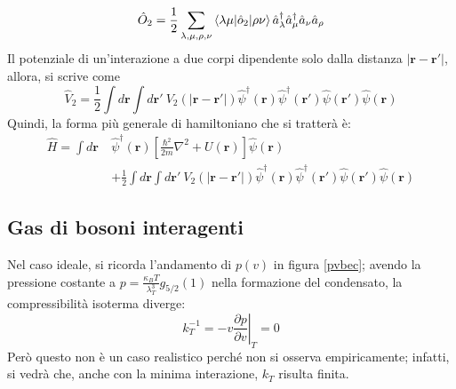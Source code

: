 \documentclass[11pt, a4paper]{scrartcl}
\theoremstyle{style}
\theoremstyle{style1}
\newcommand*\Eval[3]{\left.#1\right\rvert_{#2}^{#3}}
\numberwithin{equation}{subsection}
\begin{document}
\[
\hat{O}_2 = \frac{1}{2}\sum_{\lambda , \mu , \rho ,\nu }^{} \braket{\lambda \mu |\hat{o}_2|\rho \nu } \hat{a}^\dagger _\lambda \hat{a}^\dagger _\mu \hat{a}_\nu \hat{a}_\rho 
\] 
Il potenziale di un'interazione a due corpi dipendente solo dalla distanza $\lvert \mathbf{r} -\mathbf{r} ' \rvert $, allora, si scrive come
\begin{equation}
	\hat{V}_2 = \frac{1}{2} \int d\mathbf{r}  \int d\mathbf{r} ' \ V_2 \left(\lvert \mathbf{r} -\mathbf{r} ' \rvert \right) \hat{\psi }^\dagger (\mathbf{r} ) \hat{\psi }^\dagger (\mathbf{r} ') \hat{\psi }(\mathbf{r} ') \hat{\psi }(\mathbf{r} )
\end{equation}
Quindi, la forma pi\`u generale di hamiltoniano che si tratter\`a \`e:
\begin{equation}\label{h2}
	\begin{split}
		\hat{H} = \int d\mathbf{r} \  & \hat{\psi }^\dagger (\mathbf{r} ) \left[ \frac{\hbar ^2}{2m}\nabla ^2 + U (\mathbf{r} ) \right] \hat{\psi }(\mathbf{r} ) \\
					      &+ \frac{1}{2} \int d\mathbf{r}  \int d\mathbf{r} ' \ V_2 \left(\lvert \mathbf{r} -\mathbf{r} ' \rvert \right) \hat{\psi }^\dagger (\mathbf{r} ) \hat{\psi }^\dagger (\mathbf{r} ') \hat{\psi }(\mathbf{r} ') \hat{\psi }(\mathbf{r} )
	\end{split}
\end{equation}
\subsection{Gas di bosoni interagenti}
Nel caso ideale, si ricorda l'andamento di $p(v)$ in figura \ref{pvbec}; avendo la pressione costante a $p = \frac{\kappa _B T }{\lambda _T^3} g_{5 / 2} (1)$ nella formazione del condensato, la compressibilit\`a isoterma diverge:
\[
	k_T^{-1} = -v \Eval{\frac{\partial p}{\partial v} }{T}{} = 0
\] 
Per\`o questo non \`e un caso realistico perch\'e non si osserva empiricamente; infatti, si vedr\`a che, anche con la minima interazione, $k_T$ risulta finita.
\end{document}
